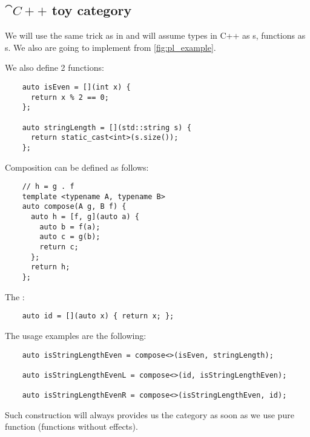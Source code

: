 \subsection{$\cat{C++}$ toy category}
\begin{example}
  \label{ex:cppcategory}
  We will use the same trick as in  and
  will assume 
  types in C++ as s, 
  functions as s.
  We also are going to implement
   from \cref{fig:pl_example}.


  We  also define 2 functions:
  \begin{verbatim}
    auto isEven = [](int x) { 
      return x % 2 == 0; 
    };

    auto stringLength = [](std::string s) { 
      return static_cast<int>(s.size()); 
    };
  \end{verbatim}

  Composition can be defined as follows:
  \begin{verbatim}
    // h = g . f
    template <typename A, typename B> 
    auto compose(A g, B f) {
      auto h = [f, g](auto a) {
        auto b = f(a);
        auto c = g(b);
        return c;
      };
      return h;
    };
  \end{verbatim}

  The :
  \begin{verbatim}
    auto id = [](auto x) { return x; };
  \end{verbatim}

  The usage examples are the following:
  \begin{verbatim}
    auto isStringLengthEven = compose<>(isEven, stringLength);

    auto isStringLengthEvenL = compose<>(id, isStringLengthEven);

    auto isStringLengthEvenR = compose<>(isStringLengthEven, id);  
  \end{verbatim}

  Such construction will always provides us the category as soon as we
  use pure function (functions without effects).
\end{example}

